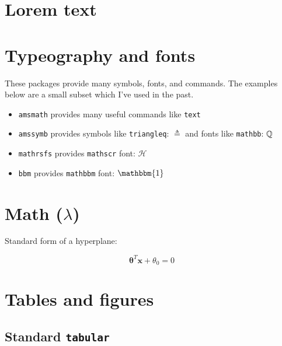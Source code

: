 
\section{Lorem text}

\lipsum[1-2]

\section{Typeography and fonts}

These packages provide many symbols, fonts, and commands.
The examples below are a small subset which I've used in the past.
\begin{itemize}
    \item \texttt{amsmath} provides many useful commands like \texttt{text}
    \item \texttt{amssymb} provides symbols like
        \texttt{triangleq}: $\triangleq$
        and fonts like \texttt{mathbb}: $\mathbb{Q}$
    \item \texttt{mathrsfs} provides \texttt{mathscr} font: $\mathscr{H}$
    \item \texttt{bbm} provides \texttt{mathbbm} font: $\mathbbm{1}$
\end{itemize}


\section{Math (\(\lambda\))}
\label{sec:SectionToReference}

Standard form of a hyperplane:

\begin{equation}
    \label{eq:MyEquation}
    \boldsymbol{\theta}^T \mathbf{x} + \theta_0 = 0
\end{equation}


\section{Tables and figures}

\subsection{Standard \texttt{tabular}}

